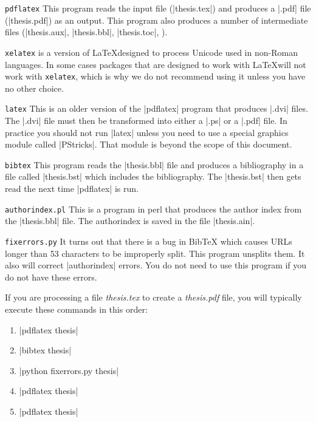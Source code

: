 \begin{description}

\item{\texttt{pdflatex}} This program reads the input file (\eg |thesis.tex|)
  and produces a |.pdf| file (\eg |thesis.pdf|) as an output. This program also
  produces a number of intermediate files (|thesis.aux|, |thesis.bbl|,
  |thesis.toc|, \etc).

\item{\texttt{xelatex}} is a version of \LaTeX designed to process Unicode used
  in non-Roman languages. In some cases packages that are designed to work with
  \LaTeX will not work with \texttt{xelatex}, which is why we do not recommend
  using it unless you have no other choice.

\item{\texttt{latex}} This is an older version of the |pdflatex| program that
  produces |.dvi| files. The |.dvi| file must then be transformed into either a
  |.ps| or a |.pdf| file. In practice you should not run |latex| unless you
  need to use a special graphics module called |PStricks|. That module is
  beyond the scope of this document.

\item{\texttt{bibtex}} This program reads the |thesis.bbl| file and produces a
  bibliography in a file called |thesis.bst| which includes the bibliography.
  The |thesis.bst| then gets read the next time |pdflatex| is run.

\item{\texttt{authorindex.pl}} This is a program in perl that produces the
  author index from the |thesis.bbl| file. The authorindex is saved in the file
  |thesis.ain|.

\item{\texttt{fixerrors.py}} It turns out that there is a bug in Bib\TeX{}
  which causes URLs longer than 53 characters to be improperly split. This
  program unsplits them. It also will correct |authorindex| errors.  You do not
  need to use this program if you do not have these errors.

\end{description}

If you are processing a file \emph{thesis.tex} to create a \emph{thesis.pdf}
file, you will typically execute these commands in this order:

\begin{enumerate}
\item |pdflatex thesis|
\item |bibtex thesis|
\item |python fixerrors.py thesis|
\item |pdflatex thesis|
\item |pdflatex thesis|
\end{enumerate}

